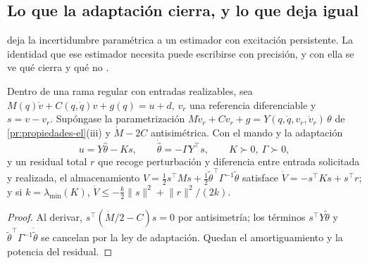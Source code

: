 \subsection{Lo que la adaptación cierra, y lo que deja igual}

 deja la incertidumbre paramétrica a un estimador con
excitación persistente. La identidad que ese estimador necesita puede escribirse
con precisión, y con ella se ve qué cierra y qué no \cite{mayorga2026m1}.

\begin{proposicion}
\label{pr:balance-adaptativo}
Dentro de una rama regular con entradas realizables, sea
$M(q)\dot v+C(q,\dot q)v+g(q)=u+d$, $v_r$ una referencia diferenciable y
$s=v-v_r$. Supóngase la parametrización
$M\dot v_r+Cv_r+g=Y(q,\dot q,v_r,\dot v_r)\,\theta$ de
\cref{pr:propiedades-el}(iii) y $\dot M-2C$ antisimétrica. Con el mando y la
adaptación
\[
  u=Y\hat\theta-Ks,\qquad \dot{\hat\theta}=-\Gamma Y^{\!\top}s,\qquad K\succ0,\ \Gamma\succ0,
\]
y un residual total $r$ que recoge perturbación y diferencia entre entrada
solicitada y realizada, el almacenamiento
$V=\tfrac12 s^{\!\top}Ms+\tfrac12\tilde\theta^{\!\top}\Gamma^{-1}\tilde\theta$
satisface $\dot V=-s^{\!\top}Ks+s^{\!\top}r$; y si $k=\lambda_{\min}(K)$,
$\dot V\le-\tfrac{k}{2}\lVert s\rVert^{2}+\lVert r\rVert^{2}/(2k)$.
\end{proposicion}

\begin{proof}
Al derivar, $s^{\!\top}(\dot M/2-C)s=0$ por antisimetría; los términos
$s^{\!\top}Y\tilde\theta$ y $\tilde\theta^{\!\top}\Gamma^{-1}\dot{\tilde\theta}$ se
cancelan por la ley de adaptación. Quedan el amortiguamiento y la potencia del
residual.
\end{proof}

